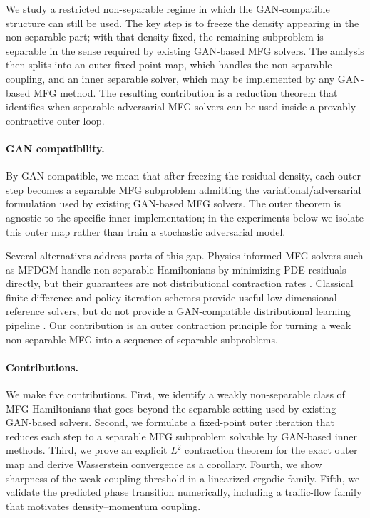 \documentclass{article}
\begin{document}
We study a restricted non-separable regime in which the GAN-compatible
structure can still be used.  The key step is to freeze the density appearing
in the non-separable part; with that density fixed, the remaining subproblem is
separable in the sense required by existing GAN-based MFG solvers.  The
analysis then splits into an outer fixed-point map, which handles the
non-separable coupling, and an inner separable solver, which may be implemented
by any GAN-based MFG method.  The resulting contribution is a reduction theorem
that identifies when separable adversarial MFG solvers can be used inside a
provably contractive outer loop.

\paragraph{GAN compatibility.}
By GAN-compatible, we mean that after freezing the residual density, each outer
step becomes a separable MFG subproblem admitting the variational/adversarial
formulation used by existing GAN-based MFG solvers.  The outer theorem is
agnostic to the specific inner implementation; in the experiments below we
isolate this outer map rather than train a stochastic adversarial model.

Several alternatives address parts of this gap.  Physics-informed MFG solvers
such as MFDGM handle non-separable Hamiltonians by minimizing PDE residuals
directly, but their guarantees are not distributional contraction rates
\citep{sirignano2018dgm,raissi2019physics,assouline2023deep}.  Classical
finite-difference and policy-iteration schemes provide useful low-dimensional
reference solvers, but do not provide a GAN-compatible distributional learning
pipeline \citep{achdou2010mean,lavigne2023policy,hu2024recent}.  Our
contribution is an outer contraction principle for turning a weak
non-separable MFG into a sequence of separable subproblems.

\paragraph{Contributions.}
We make five contributions.  First, we identify a weakly non-separable class of
MFG Hamiltonians that goes beyond the separable setting used by existing
GAN-based solvers.  Second, we formulate a fixed-point outer iteration that
reduces each step to a separable MFG subproblem solvable by GAN-based inner
methods.  Third, we prove an explicit \(L^2\) contraction theorem for the exact
outer map and derive Wasserstein convergence as a corollary.  Fourth, we show
sharpness of the weak-coupling threshold in a linearized ergodic family.  Fifth,
we validate the predicted phase transition numerically, including a
traffic-flow family that motivates density--momentum coupling.
\end{document}
